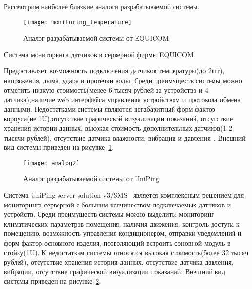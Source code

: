 Рассмотрим наиболее близкие аналоги разрабатываемой системы. 

\begin{figure}[!h]
	\centering
	\texttt{[image: monitoring\_temperature]}
	\caption{Аналог разрабатываемой системы от EQUICOM}
	\label{fig:monitoring_temperature}
\end{figure}

Система мониторинга датчиков в серверной фирмы EQUICOM.

Предоставляет возможность подключения датчиков температуры(до 2шт), напряжения, дыма, удара и протечки воды. Среди преимуществ системы можно отметить низкую стоимость(менее 6 тысяч рублей за устройство и 4 датчика),наличие web интерфейса управления устройством и протокола обмена данными. Недостатками системы являются негабаритный форм-фактор корпуса(не 1U),отсутствие графической визуализации показаний, отсутствие хранения истории  данных, высокая стоимость дополнительных датчиков(1-2 тысячи рублей), отсутствие датчика влажности, вибрации и давления~\cite{analog1}. Внешний вид системы приведен на рисунке~\ref{fig:monitoring_temperature}.

\begin{figure}[!h]
	\centering
	\texttt{[image: analog2]}
	\caption{Аналог разрабатываемой системы от  UniPing}
	\label{fig:analog2}
\end{figure}

Система UniPing server solution v3/SMS~\cite{analog2} является комплексным решением для мониторинга серверной с большим колчичеством подключаемых датчиков и устройств. Среди преимуществ системы можно выделить: мониторинг климатических параметров помещения, наличия движения, контроль доступа к помещению, возможность управления кондиционером, отправки уведомлений и форм-фактор основного изделия, позволяющий встроить  соновной модуль в стойку(1U). К недостаткам системы относятся высокая стоимость(более 32 тысяч рублей), отсутствие хранения истории данных, отсутствие датчика давления, вибрации, отсутствие графической визуализации показаний. Внешний вид системы приведен на рисунке~\ref{fig:analog2}. 

